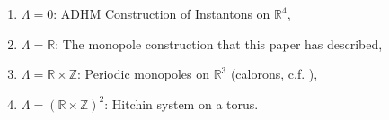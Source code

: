 	\begin{enumerate}
		\item $\Lambda = 0$: ADHM Construction of Instantons on $\mathbb R^4$,
		\item $\Lambda = \mathbb R$: The monopole construction that this paper has described,
		\item $\Lambda = \mathbb R \times \mathbb Z$: Periodic monopoles on $\mathbb R^3$ (calorons, c.f. \cite{nye2003}),
		\item $\Lambda = (\mathbb R \times \mathbb Z)^2$: Hitchin system on a torus.
	\end{enumerate}


	